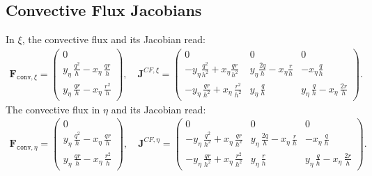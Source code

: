 \subsection{Convective Flux Jacobians}
In $\xi$, the convective flux and its Jacobian read:
%
\begin{align}
	\mathbf{F}_{\texttt{conv},\xi}=
	\begin{pmatrix}
		0\\
		y_{\eta}\, \frac{q^2}{h} - x_{\eta}\, \frac{q r}{h}\\
		y_{\eta}\, \frac{q r}{h} - x_{\eta}\, \frac{r^2}{h}
	\end{pmatrix}, \quad
	\mathbf{J}^{CF,\xi}=
	\begin{pmatrix}
		0 & 0 & 0\\
		-y_{\eta}\frac{q^2}{h^2} + x_{\eta} \frac{qr}{h^2}
		& y_{\eta}\frac{2q}{h} - x_{\eta} \frac{r}{h}
		& - x_{\eta} \frac{q}{h}\\
		-y_{\eta}\, \frac{q r}{h^2} + x_{\eta}\, \frac{r^2}{h^2}
		& y_{\eta}\, \frac{q}{h}
		& y_{\eta}\, \frac{q}{h} - x_{\eta}\, \frac{2r}{h}
	\end{pmatrix}.
\end{align}
%
The convective flux in $\eta$ and its Jacobian read:
%
\begin{align}
	\mathbf{F}_{\texttt{conv},\eta}=
	\begin{pmatrix}
		0\\
		y_{\eta}\, \frac{q^2}{h} - x_{\eta}\, \frac{q r}{h}\\
		y_{\eta}\, \frac{q r}{h} - x_{\eta}\, \frac{r^2}{h}
	\end{pmatrix}, \quad
	\mathbf{J}^{CF,\eta}=
	\begin{pmatrix}
		0 & 0 & 0\\
		-y_{\eta}\, \frac{q^2}{h^2} + x_{\eta}\, \frac{q r}{h^2}
		&y_{\eta}\, \frac{2q}{h} - x_{\eta}\, \frac{r}{h}
		& - x_{\eta}\, \frac{q}{h}\\
		-y_{\eta}\, \frac{q r}{h^2} + x_{\eta}\, \frac{r^2}{h^2}
		& y_{\eta}\, \frac{r}{h}
		& y_{\eta}\, \frac{q}{h} - x_{\eta}\, \frac{2r}{h}
	\end{pmatrix}.
\end{align}
